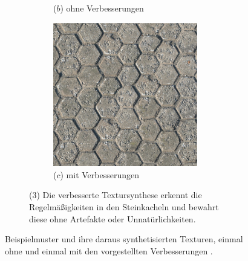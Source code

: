 \begin{figure}
\begin{subfigure}{0.9\textwidth}
\begin{subfigure}{0.3\textwidth}
		\caption*{($b$) ohne Verbesserungen}
	\end{subfigure}
	\hfill
	\begin{subfigure}{0.3\textwidth}
		\centering
		\includegraphics[width=0.9\textwidth]{images/example-3-with}
		\caption*{($c$) mit Verbesserungen}
	\end{subfigure}
	
	\caption*{($3$) Die verbesserte Textursynthese erkennt die Regelmäßigkeiten in den Steinkacheln und bewahrt diese ohne Artefakte oder Unnatürlichkeiten.}
\end{subfigure}

\label{3-examples}
\caption{Beispielmuster und ihre daraus synthetisierten Texturen, einmal ohne und einmal mit den vorgestellten Verbesserungen \cite{SelfTuning}.}
\end{figure}